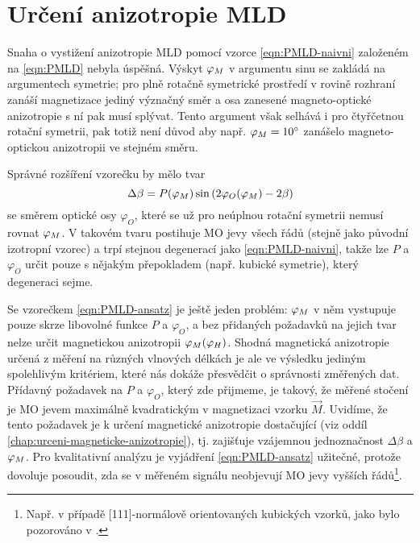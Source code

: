 \section{Určení anizotropie MLD}
\label{chap:anizotropie-MLD}

Snaha o vystižení anizotropie MLD pomocí vzorce \eqref{eqn:PMLD-naivni} založeném na \eqref{eqn:PMLD} nebyla úspěšná.
Výskyt $\varphi_M$ v argumentu sinu se zakládá na argumentech symetrie; pro plně rotačně symetrické prostředí v rovině rozhraní zanáší magnetizace jediný význačný směr a osa zanesené magneto-optické anizotropie s ní pak musí splývat.
Tento argument však selhává i pro čtyřčetnou rotační symetrii, pak totiž není důvod aby např. $\varphi_M=\SI{10}{\degree}$ zanášelo magneto-optickou anizotropii ve stejném směru.

Správné rozšíření vzorečku by mělo tvar
\begin{equation}
\label{eqn:PMLD-ansatz}
    \Delta\beta = P(\varphi_M) \sin \left( 2\varphi_O(\varphi_M) - 2\beta   \right)
\end{equation}
se směrem optické osy $\varphi_O$, které se už pro neúplnou rotační symetrii nemusí rovnat $\varphi_M$.
V takovém tvaru postihuje MO jevy všech řádů (stejně jako původní izotropní vzorec) a trpí stejnou degenerací jako \eqref{eqn:PMLD-naivni}, takže lze $P$ a $\varphi_O$ určit pouze s nějakým přepokladem (např. kubické symetrie), který degeneraci sejme.

Se vzorečkem \eqref{eqn:PMLD-ansatz} je ještě jeden problém: $\varphi_M$ v něm vystupuje pouze skrze libovolné funkce $P$ a $\varphi_O$, a bez přidaných požadavků na jejich tvar nelze určit magnetickou anizotropii $\varphi_M(\varphi_H)$.
Shodná magnetická anizotropie určená z měření na různých vlnových délkách je ale ve výsledku jediným spolehlivým kritériem, které nás dokáže přesvědčit o správnosti změřených dat.
Přídavný požadavek na $P$ a $\varphi_O$, který zde přijmeme, je takový, že měřené stočení je MO jevem maximálně kvadratickým v magnetizaci vzorku $\vec{M}$.
Uvidíme, že tento požadavek je k určení magnetické anizotropie dostačující (viz oddíl \ref{chap:urceni-magneticke-anizotropie}), tj. zajišťuje vzájemnou jednoznačnost $\Delta\beta$ a $\varphi_M$.
Pro kvalitativní analýzu je vyjádření \eqref{eqn:PMLD-ansatz} užitečné, protože dovoluje posoudit, zda se v měřeném signálu neobjevují MO jevy vyšších řádů\footnote{Např. v případě [111]-normálově orientovaných kubických vzorků, jako bylo pozorováno v \cite{silberQuadraticMagnetoopticKerr2019a}.}.

